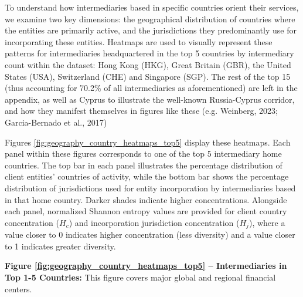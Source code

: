 To understand how intermediaries based in specific countries orient their services, we examine two key dimensions: the geographical distribution of countries where the entities are primarily active, and the jurisdictions they predominantly use for incorporating these entities. Heatmaps are used to visually represent these patterns for intermediaries headquartered in the top 5 countries by intermediary count within the dataset: Hong Kong (HKG), Great Britain (GBR), the United States (USA), Switzerland (CHE) and Singapore (SGP). The rest of the top 15 (thus accounting for 70.2\% of all intermediaries as aforementioned) are left in the appendix, as well as Cyprus to illustrate the well-known Russia-Cyprus corridor, and how they manifest themselves in figures like these (e.g. Weinberg, 2023; Garcia-Bernado et al., 2017) 

Figures \ref{fig:geography_country_heatmaps_top5} display these heatmaps. Each panel within these figures corresponds to one of the top 5 intermediary home countries. The top bar in each panel illustrates the percentage distribution of client entities' countries of activity, while the bottom bar shows the percentage distribution of jurisdictions used for entity incorporation by intermediaries based in that home country. Darker shades indicate higher concentrations. Alongside each panel, normalized Shannon entropy values are provided for client country concentration ($H_c$) and incorporation jurisdiction concentration ($H_j$), where a value closer to 0 indicates higher concentration (less diversity) and a value closer to 1 indicates greater diversity.


\textbf{Figure \ref{fig:geography_country_heatmaps_top5} – Intermediaries in Top 1-5 Countries:}
This figure covers major global and regional financial centers.

